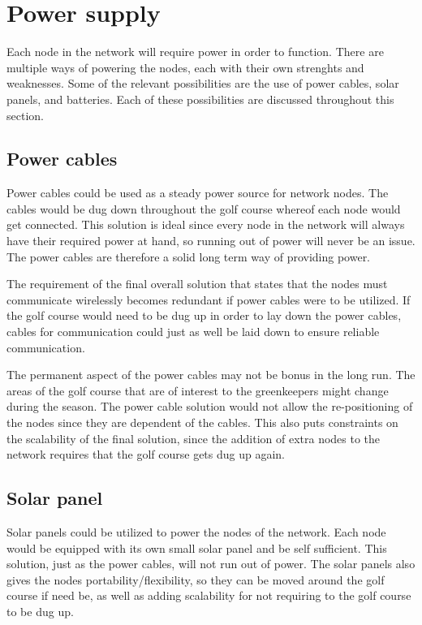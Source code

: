 \section{Power supply}

Each node in the network will require power in order to function. There are multiple ways of powering the nodes, each with their own strenghts and weaknesses. Some of the relevant possibilities are the use of power cables, solar panels, and batteries. Each of these possibilities are discussed throughout this section.


\subsection*{Power cables}
Power cables could be used as a steady power source for network nodes. The cables would be dug down throughout the golf course whereof each node would get connected. This solution is ideal since every node in the network will always have their required power at hand, so running out of power will never be an issue. The power cables are therefore a solid long term way of providing power.

The requirement of the final overall solution that states that the nodes must communicate wirelessly becomes redundant if power cables were to be utilized. If the golf course would need to be dug up in order to lay down the power cables, cables for communication could just as well be laid down to ensure reliable communication.

The permanent aspect of the power cables may not be bonus in the long run. The areas of the golf course that are of interest to the greenkeepers might change during the season. The power cable solution would not allow the re-positioning of the nodes since they are dependent of the cables. This also puts constraints on the scalability of the final solution, since the addition of extra nodes to the network requires that the golf course gets dug up again.

\subsection*{Solar panel}
Solar panels could be utilized to power the nodes of the network. Each node would be equipped with its own small solar panel and be self sufficient. This solution, just as the power cables, will not run out of power. The solar panels also gives the nodes portability/flexibility, so they can be moved around the golf course if need be, as well as adding scalability for not requiring to the golf course to be dug up.

